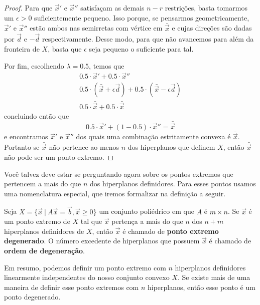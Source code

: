 \begin{thm:ponto extremo}
\begin{proof}
		Para que $\vec{x}'$ e $\vec{x}''$ satisfaçam as demais $n - r$ restrições, basta tomarmos um $\epsilon > 0$ suficientemente pequeno. Isso porque, se pensarmos geometricamente,  $\vec{x}'$ e $\vec{x}''$ estão ambos nas semirretas com vértice em $\bar{\vec{x}}$ e cujas direções são dadas por $\vec{d}$ e $-\vec{d}$ respectivamente. Desse modo, para que não avancemos para além da fronteira de $X$, basta que $\epsilon$ seja pequeno o suficiente para tal.
		
		Por fim, escolhendo $\lambda = 0.5$, temos que
		\begin{gather*}
			0.5 \cdot \vec{x}' + 0.5 \cdot \vec{x}'' \\
			0.5 \cdot (\bar{\vec{x}} + \epsilon \vec{d}) +
			0.5 \cdot (\bar{\vec{x}} - \epsilon \vec{d}) \\
			0.5 \cdot \bar{\vec{x}} + 0.5 \cdot \bar{\vec{x}} 			
		\end{gather*}
		concluindo então que
		\begin{equation*}
			0.5 \cdot \vec{x}' + (1 - 0.5) \cdot \vec{x}'' = \bar{\vec{x}}
		\end{equation*}
		e encontramos $\vec{x}'$ e $\vec{x}''$ dos quais uma combinação estritamente convexa é $\bar{\vec{x}}$. Portanto se $\bar{\vec{x}}$ não pertence ao menos $n$ dos hiperplanos que definem $X$, então $\bar{\vec{x}}$ não pode ser um ponto extremo. 
	\end{proof}
\end{thm:ponto extremo}

Você talvez deve estar se perguntando agora sobre os pontos extremos que pertencem a mais do que $n$ dos hiperplanos definidores. Para esses pontos usamos uma nomenclatura especial, que iremos formalizar na definição a seguir.

\begin{def:ponto degenerado}
	Seja $X = \{\vec{x}\ |\ A\vec{x} = \vec{b}, \vec{x} \geq 0\}$ um conjunto poliédrico em que $A$ é $m \times n$. Se $\vec{x}$ é um ponto extremo de $X$ tal que $\vec{x}$ pertença a mais do que $n$ dos $n + m$ hiperplanos definidores de $X$, então $\vec{x}$ é chamado de \textbf{ponto extremo degenerado}. O número excedente de hiperplanos que possuem $\vec{x}$ é chamado de \textbf{ordem de degeneração}.
\end{def:ponto degenerado}

Em resumo, podemos definir um ponto extremo com $n$ hiperplanos definidores linearmente independentes do nosso conjunto convexo $X$. Se existe mais de uma maneira de definir esse ponto extremos com $n$ hiperplanos, então esse ponto é um ponto degenerado.

